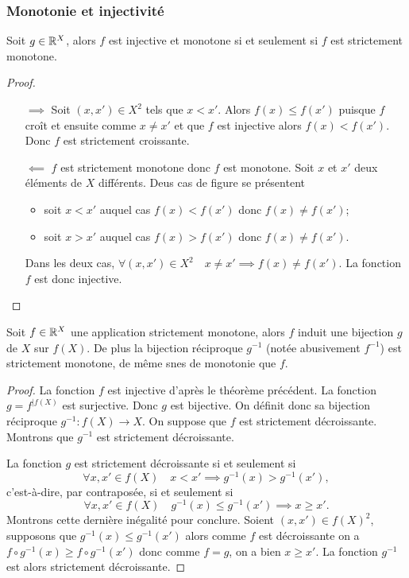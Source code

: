 \subsubsection{Monotonie et injectivité}
\begin{theo}
  Soit $g \in \mathbb{R}^X$, alors $f$ est injective et monotone si et seulement si $f$ est strictement monotone.
\end{theo}
\begin{proof}
  \begin{itemize}
  \item[$\implies$] Soit $(x,x') \in X^2$ tels que $x < x'$. Alors $f(x) \leq f(x')$ puisque $f$ croît et ensuite comme $x \neq x'$ et que $f$ est injective alors $f(x) < f(x')$. Donc $f$ est strictement croissante.
  \item[$\impliedby$] $f$ est strictement monotone donc $f$ est monotone. Soit $x$ et $x'$ deux éléments de $X$ différents. Deus cas de figure se présentent
    \begin{itemize}
    \item soit $x < x'$ auquel cas $f(x) < f(x')$ donc $f(x) \neq f(x')$;
    \item soit $x > x'$ auquel cas $f(x) > f(x')$ donc $f(x) \neq f(x')$.
    \end{itemize}
    Dans les deux cas, $\forall (x,x') \in X^2 \quad x \neq x' \implies f(x) \neq f(x')$. La fonction $f$ est donc injective.
  \end{itemize}
\end{proof}
\begin{cor}
  Soit $f \in \mathbb{R}^X$ une application strictement monotone, alors $f$ induit une bijection $g$ de $X$ sur $f(X)$. De plus la bijection réciproque $g^{-1}$ (notée abusivement $f^{-1}$) est strictement monotone, de même snes de monotonie que $f$.
\end{cor}
\begin{proof}
  La fonction $f$ est injective d'après le théorème précédent. La fonction $g=f^{|f(X)}$ est surjective. Donc $g$ est bijective. On définit donc sa bijection réciproque $g^{-1}:f(X) \longrightarrow X$. On suppose que $f$ est strictement décroissante. Montrons que $g^{-1}$ est strictement décroissante.

La fonction $g$ est strictement décroissante si et seulement si
\begin{equation}
  \forall x,x' \in f(X) \quad x < x' \implies g^{-1}(x) > g^{-1}(x') ,
\end{equation}
c'est-à-dire, par contraposée, si et seulement si 
\begin{equation}
  \forall x,x' \in f(X) \quad  g^{-1}(x) \leq g^{-1}(x') \implies x \geq x'.
\end{equation}
Montrons cette dernière inégalité pour conclure. Soient $(x, x') \in f(X)^2$, supposons que $g^{-1}(x) \leq g^{-1}(x')$ alors comme $f$ est décroissante on a $f \circ g^{-1}(x) \geq f \circ g^{-1}(x')$ donc comme $f=g$, on a bien $x \geq x'$. La fonction $g^{-1}$ est alors strictement décroissante.
\end{proof}

